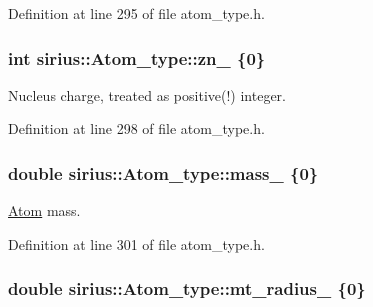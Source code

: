 Definition at line 295 of file atom\+\_\+type.\+h.

\hypertarget{classsirius_1_1_atom__type_a8f913917b54707ed690586c8fa53c539}{}
\subsubsection[{zn\+\_\+}]{\setlength{\rightskip}{0pt plus 5cm}int sirius\+::\+Atom\+\_\+type\+::zn\+\_\+ \{0\}\hspace{0.3cm}{\ttfamily [private]}}\label{classsirius_1_1_atom__type_a8f913917b54707ed690586c8fa53c539}


Nucleus charge, treated as positive(!) integer. 



Definition at line 298 of file atom\+\_\+type.\+h.

\hypertarget{classsirius_1_1_atom__type_af09ff617fe4a88ec3083036b7aff9918}{}
\subsubsection[{mass\+\_\+}]{\setlength{\rightskip}{0pt plus 5cm}double sirius\+::\+Atom\+\_\+type\+::mass\+\_\+ \{0\}\hspace{0.3cm}{\ttfamily [private]}}\label{classsirius_1_1_atom__type_af09ff617fe4a88ec3083036b7aff9918}


\hyperlink{classsirius_1_1_atom}{Atom} mass. 



Definition at line 301 of file atom\+\_\+type.\+h.

\hypertarget{classsirius_1_1_atom__type_a2d7ed2ae5ecbbc38dc3eae62dbff4c21}{}
\subsubsection[{mt\+\_\+radius\+\_\+}]{\setlength{\rightskip}{0pt plus 5cm}double sirius\+::\+Atom\+\_\+type\+::mt\+\_\+radius\+\_\+ \{0\}\hspace{0.3cm}{\ttfamily [private]}}\label{classsirius_1_1_atom__type_a2d7ed2ae5ecbbc38dc3eae62dbff4c21}


